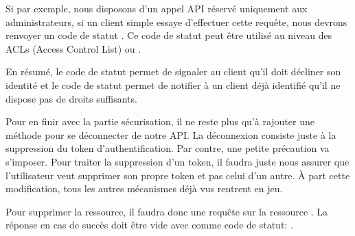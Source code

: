 \documentclass[big]{zmdocument}
\begin{document}
Si par exemple, nous disposons d'un appel API réservé uniquement aux administrateurs, si un client simple essaye d'effectuer cette requête, nous devrons renvoyer un code de statut . Ce code de statut peut être utilisé au niveau des ACLs (Access Control List) ou .



\begin{Information}
En résumé, le code de statut  permet de signaler au client qu'il doit décliner son identité et le code de statut  permet de notifier à un client déjà identifié qu'il ne dispose pas de droits suffisants.
\end{Information}




Pour en finir avec la partie sécurisation, il ne reste plus qu'à rajouter une méthode pour se déconnecter de notre API.
La déconnexion consiste juste à la suppression du token d'authentification.
Par contre, une petite précaution va s'imposer. Pour traiter la suppression d'un token, il faudra juste nous assurer que l'utilisateur veut supprimer son propre token et pas celui d'un autre.
À part cette modification, tous les autres mécanismes déjà vus rentrent en jeu.



Pour supprimer la ressource, il faudra donc une requête  sur la ressource . La réponse en cas de succès doit être vide avec comme code de statut: .
\end{document}
